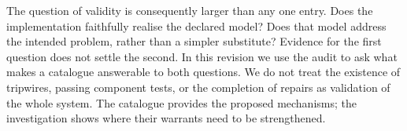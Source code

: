 The question of validity is consequently larger than any one entry. Does the
implementation faithfully realise the declared model? Does that model address
the intended problem, rather than a simpler substitute? Evidence for the first
question does not settle the second. In this revision we use the audit to ask
what makes a catalogue answerable to both questions. We do not treat the
existence of tripwires, passing component tests, or the completion of repairs as
validation of the whole system. The catalogue provides the proposed mechanisms;
the investigation shows where their warrants need to be strengthened.
